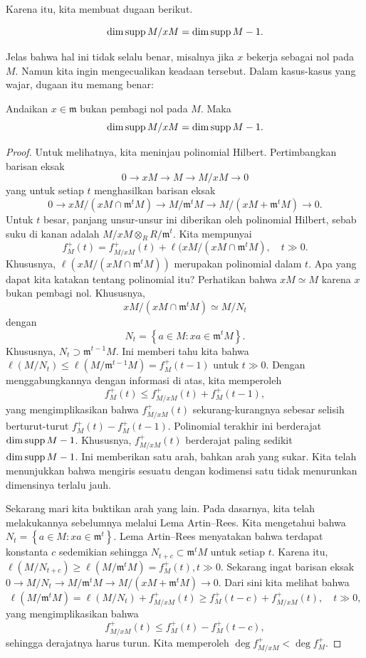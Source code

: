 Karena itu, kita membuat dugaan berikut.
\begin{prediction}
\[ \mathrm{dim} \operatorname{supp} M/xM = \mathrm{dim} \operatorname{supp} M - 1.  \]
\end{prediction}
Jelas bahwa hal ini tidak selalu benar, misalnya jika $x$ bekerja sebagai nol pada $M$. Namun kita ingin
mengecualikan keadaan tersebut. 
Dalam kasus-kasus yang wajar, dugaan itu memang benar:

\begin{proposition} \label{dimdropsbyone}
Andaikan $x \in \mathfrak{m}$ bukan pembagi nol pada $M$. Maka 
\[ \mathrm{dim} \operatorname{supp} M/xM = \mathrm{dim} \operatorname{supp} M - 1.  \]
\end{proposition} 
\begin{proof} 
Untuk melihatnya, kita meninjau polinomial Hilbert. Pertimbangkan barisan eksak
\[ 0 \to xM \to M \to M/xM \to 0  \]
yang untuk setiap $t$ menghasilkan barisan eksak
\[ 0 \to xM/(xM \cap \mathfrak{m}^t M) \to M/\mathfrak{m}^t M \to M/(xM  +
\mathfrak{m}^t M) \to 0 . \]
Untuk $t$ besar, panjang unsur-unsur ini diberikan oleh polinomial Hilbert,
sebab suku di kanan adalah $M/xM \otimes_R R/\mathfrak{m}^t$. 
Kita mempunyai
\[ f_M^+(t) = f_{M/xM}^+(t) + \ell(xM/ (x M \cap \mathfrak{m}^t M), \quad t
\gg 0.  \]
Khususnya, $\ell( xM/ (xM \cap \mathfrak{m}^t M))$ merupakan polinomial dalam $t$.
Apa yang dapat kita katakan tentang polinomial itu? Perhatikan bahwa $xM \simeq M$ karena $x$ bukan pembagi nol.
Khususnya,
\[ xM / (xM \cap \mathfrak{m}^t M) \simeq M/N_t  \]
dengan
\[ N_t = \left\{a \in M: xa \in \mathfrak{m}^t M\right\} . \]
Khususnya, $N_t \supset \mathfrak{m}^{t-1} M$. Ini memberi tahu kita bahwa
$\ell(M/N_t) \leq \ell(M/\mathfrak{m}^{t-1} M) = f_M^+(t-1)$ untuk $t \gg 0$.
Dengan menggabungkannya dengan informasi di atas, kita memperoleh
\[ f_M^+(t) \leq f_{M/xM}^+(t) + f_M^+(t-1),   \]
yang mengimplikasikan bahwa $f_{M/xM}^+(t)$ sekurang-kurangnya sebesar selisih berturut-turut
$f_M^+(t) - f_M^+(t-1)$. Polinomial terakhir ini berderajat $\mathrm{dim} \operatorname{supp} M -1$. Khususnya,
$f_{M/xM}^+(t)$ berderajat paling sedikit $\mathrm{dim} \operatorname{supp} M -1 $. Ini memberikan
satu arah, bahkan arah yang sukar. Kita telah menunjukkan bahwa mengiris sesuatu dengan kodimensi satu
tidak menurunkan dimensinya terlalu jauh. 

Sekarang mari kita buktikan arah yang lain. Pada dasarnya, kita telah melakukannya sebelumnya melalui
Lema Artin--Rees. Kita mengetahui bahwa $N_t = \left\{a \in M: xa \in
\mathfrak{m}^t\right\}$. Lema Artin--Rees menyatakan bahwa terdapat konstanta
$c$ sedemikian sehingga $N_{t+c} \subset \mathfrak{m}^t M$ untuk setiap $t$. Karena itu,
$\ell(M/N_{t+c}) \geq \ell(M/\mathfrak{m}^t M) = f_M^+(t), t \gg 0$. Sekarang
ingat barisan eksak $0 \to M/N_t \to M/\mathfrak{m}^t M \to M/(xM +
\mathfrak{m}^t M) \to 0$. Dari sini kita melihat bahwa
\[ \ell(M/ \mathfrak{m}^t M) = \ell(M/N_t) + f_{M/xM}^+(t) \geq f_M^+(t-c) +
f_{M/xM}^+(t), \quad t \gg 0,  \]
yang mengimplikasikan bahwa
\[ f_{M/xM}^+(t) \leq f_M^+(t) - f_M^+(t-c),  \]
sehingga derajatnya harus turun. Kita memperoleh $\deg f_{M/xM}^+ < \deg f_{M}^+$.
\end{proof} 


